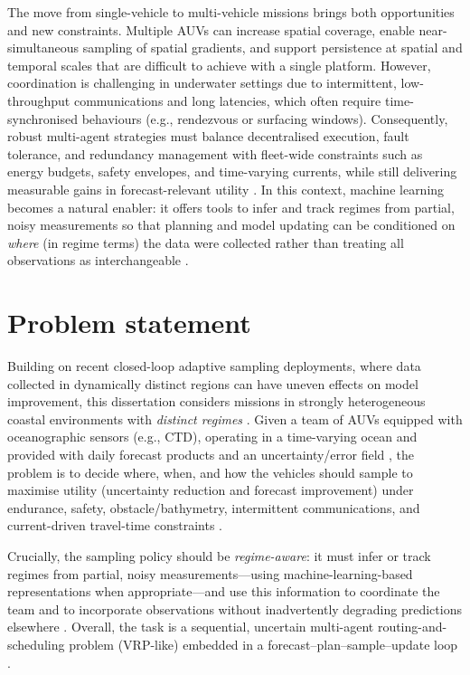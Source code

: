 The move from single-vehicle to multi-vehicle missions brings both opportunities and new constraints. Multiple AUVs can
increase spatial coverage, enable near-simultaneous sampling of spatial gradients, and support persistence at spatial and
temporal scales that are difficult to achieve with a single platform. However, coordination is challenging in underwater
settings due to intermittent, low-throughput communications and long latencies, which often require time-synchronised
behaviours (e.g., rendezvous or surfacing windows). Consequently, robust multi-agent strategies must balance decentralised
execution, fault tolerance, and redundancy management with fleet-wide constraints such as energy budgets, safety envelopes,
and time-varying currents, while still delivering measurable gains in forecast-relevant utility \cite{bernacchi2025closingloop}.
In this context, machine learning becomes a natural enabler: it offers tools to infer and track regimes from partial, noisy
measurements so that planning and model updating can be conditioned on \emph{where} (in regime terms) the data were collected
rather than treating all observations as interchangeable \cite{mendes2025oceanmodeldriven}.


\section{Problem statement} \label{sec:problem_statement}

Building on recent closed-loop adaptive sampling deployments, where data collected in dynamically distinct regions can have
uneven effects on model improvement, this dissertation considers missions in strongly heterogeneous coastal environments
with \emph{distinct regimes} \cite{mendes2025oceanmodeldriven}. Given a team of AUVs equipped with oceanographic sensors
(e.g., CTD), operating in a time-varying ocean and provided with daily forecast products and an uncertainty/error field
\cite{bernacchi2025closingloop}, the problem is to decide where, when, and how the vehicles should sample to maximise
utility (uncertainty reduction and forecast improvement) under endurance, safety, obstacle/bathymetry, intermittent
communications, and current-driven travel-time constraints \cite{aguiar2018trajectoryopt}.

Crucially, the sampling policy should be \emph{regime-aware}: it must infer or track regimes from partial, noisy
measurements—using machine-learning-based representations when appropriate—and use this information to coordinate the team
and to incorporate observations without inadvertently degrading predictions elsewhere \cite{mendes2025oceanmodeldriven}.
Overall, the task is a sequential, uncertain multi-agent routing-and-scheduling problem (VRP-like) embedded in a
forecast--plan--sample--update loop \cite{bernacchi2025closingloop}.

